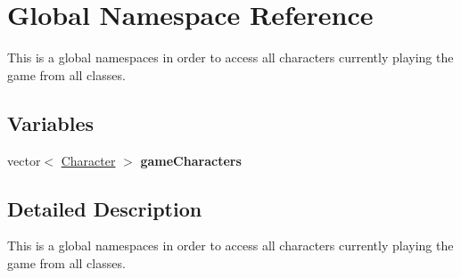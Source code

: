 \hypertarget{namespaceGlobal}{}\section{Global Namespace Reference}
\label{namespaceGlobal}


This is a global namespaces in order to access all characters currently playing the game from all classes.  


\subsection*{Variables}
\begin{DoxyCompactItemize}
\item 
\hypertarget{namespaceGlobal_a51f75ced20b71e3b4d2b43568bddfc4d}{}\label{namespaceGlobal_a51f75ced20b71e3b4d2b43568bddfc4d} 
vector$<$ \hyperlink{classCharacter}{Character} $>$ {\bfseries game\+Characters}
\end{DoxyCompactItemize}


\subsection{Detailed Description}
This is a global namespaces in order to access all characters currently playing the game from all classes. 